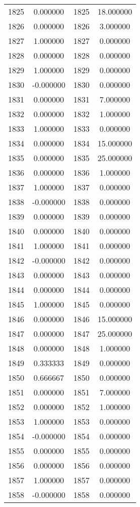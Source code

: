 \documentclass[12pt]{article}
\begin{document}
\begin{longtable}{@{}cccc@{}}
1825 & 0.000000 & 1825 & 18.000000 \\
1826 & 0.000000 & 1826 & 3.000000 \\
1827 & 1.000000 & 1827 & 0.000000 \\
1828 & 0.000000 & 1828 & 0.000000 \\
1829 & 1.000000 & 1829 & 0.000000 \\
1830 & -0.000000 & 1830 & 0.000000 \\
1831 & 0.000000 & 1831 & 7.000000 \\
1832 & 0.000000 & 1832 & 1.000000 \\
1833 & 1.000000 & 1833 & 0.000000 \\
1834 & 0.000000 & 1834 & 15.000000 \\
1835 & 0.000000 & 1835 & 25.000000 \\
1836 & 0.000000 & 1836 & 1.000000 \\
1837 & 1.000000 & 1837 & 0.000000 \\
1838 & -0.000000 & 1838 & 0.000000 \\
1839 & 0.000000 & 1839 & 0.000000 \\
1840 & 0.000000 & 1840 & 0.000000 \\
1841 & 1.000000 & 1841 & 0.000000 \\
1842 & -0.000000 & 1842 & 0.000000 \\
1843 & 0.000000 & 1843 & 0.000000 \\
1844 & 0.000000 & 1844 & 0.000000 \\
1845 & 1.000000 & 1845 & 0.000000 \\
1846 & 0.000000 & 1846 & 15.000000 \\
1847 & 0.000000 & 1847 & 25.000000 \\
1848 & 0.000000 & 1848 & 1.000000 \\
1849 & 0.333333 & 1849 & 0.000000 \\
1850 & 0.666667 & 1850 & 0.000000 \\
1851 & 0.000000 & 1851 & 7.000000 \\
1852 & 0.000000 & 1852 & 1.000000 \\
1853 & 1.000000 & 1853 & 0.000000 \\
1854 & -0.000000 & 1854 & 0.000000 \\
1855 & 0.000000 & 1855 & 0.000000 \\
1856 & 0.000000 & 1856 & 0.000000 \\
1857 & 1.000000 & 1857 & 0.000000 \\
1858 & -0.000000 & 1858 & 0.000000 \\

\end{longtable}
\end{document}
